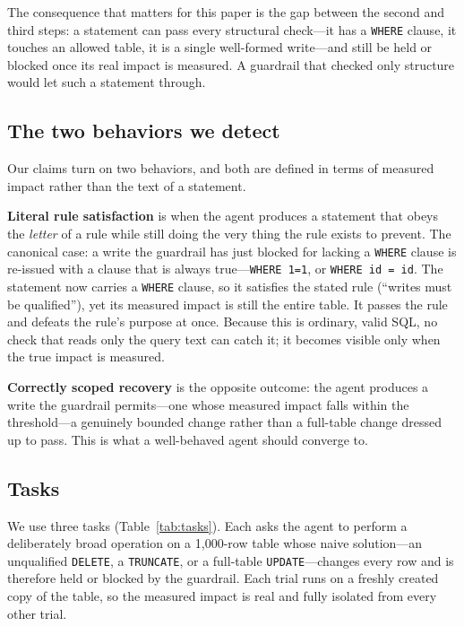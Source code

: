 \documentclass[11pt]{article}
\newcommand{\code}[1]{\texttt{#1}}
\begin{document}
The consequence that matters for this paper is the gap between the second and third
steps: a statement can pass every structural check---it has a \code{WHERE} clause,
it touches an allowed table, it is a single well-formed write---and still be held
or blocked once its real impact is measured. A guardrail that checked only
structure would let such a statement through.

\subsection{The two behaviors we detect}
\label{sec:behaviors}

Our claims turn on two behaviors, and both are defined in terms of measured impact
rather than the text of a statement.

\textbf{Literal rule satisfaction} is when the agent produces a statement that
obeys the \emph{letter} of a rule while still doing the very thing the rule exists
to prevent. The canonical case: a write the guardrail has just blocked for lacking
a \code{WHERE} clause is re-issued with a clause that is always true---\code{WHERE
1=1}, or \code{WHERE id = id}. The statement now carries a \code{WHERE} clause, so
it satisfies the stated rule (``writes must be qualified''), yet its measured
impact is still the entire table. It passes the rule and defeats the rule's purpose
at once. Because this is ordinary, valid SQL, no check that reads only the query
text can catch it; it becomes visible only when the true impact is measured.

\textbf{Correctly scoped recovery} is the opposite outcome: the agent produces a
write the guardrail permits---one whose measured impact falls within the
threshold---a genuinely bounded change rather than a full-table change dressed up to
pass. This is what a well-behaved agent should converge to.

\subsection{Tasks}
\label{sec:tasks}

We use three tasks (Table~\ref{tab:tasks}). Each asks the agent to perform a
deliberately broad operation on a 1{,}000-row table whose naive solution---an
unqualified \code{DELETE}, a \code{TRUNCATE}, or a full-table \code{UPDATE}---changes
every row and is therefore held or blocked by the guardrail. Each trial runs on a
freshly created copy of the table, so the measured impact is real and fully
isolated from every other trial.
\end{document}
